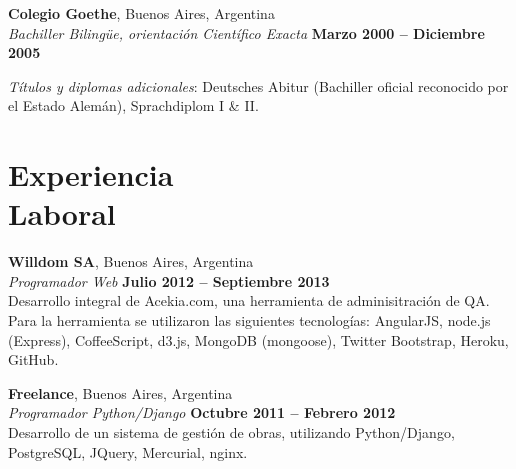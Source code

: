 \documentclass[margin,line]{resume}
\begin{document}
\begin{resume}
    \textbf{Colegio Goethe}, Buenos Aires, Argentina \vspace{2mm}\\\vspace{1mm}%
    \textsl{Bachiller Bilingüe, orientación Científico Exacta} \hfill \textbf{ Marzo 2000 -- Diciembre 2005}\vspace{-3mm}\\\vspace{-1mm}%
    \begin{list2}
        \item \textit{Títulos y diplomas adicionales}: Deutsches Abitur (Bachiller oficial reconocido por el Estado Alemán), Sprachdiplom I \& II.
    \end{list2}\vspace{-1.5mm}

    \section{\mysidestyle Experiencia\\Laboral}

    \textbf{Willdom SA}, Buenos Aires, Argentina \vspace{2mm}\\\vspace{1mm}%
    \textsl{Programador Web} \hfill \textbf{Julio 2012 -- Septiembre 2013}\vspace{1.5mm}\\\vspace{0mm}%
    Desarrollo integral de Acekia.com, una herramienta de adminisitración de QA. Para la herramienta se utilizaron las siguientes tecnologías: AngularJS, node.js (Express), CoffeeScript, d3.js, MongoDB (mongoose), Twitter Bootstrap, Heroku, GitHub.  

    \textbf{Freelance}, Buenos Aires, Argentina \vspace{2mm}\\\vspace{1mm}%
    \textsl{Programador Python/Django} \hfill \textbf{Octubre 2011 -- Febrero 2012}\vspace{1.5mm}\\\vspace{0mm}%
	Desarrollo de un sistema de gestión de obras, utilizando Python/Django, PostgreSQL, JQuery, Mercurial, nginx.


\end{resume}
\end{document}
